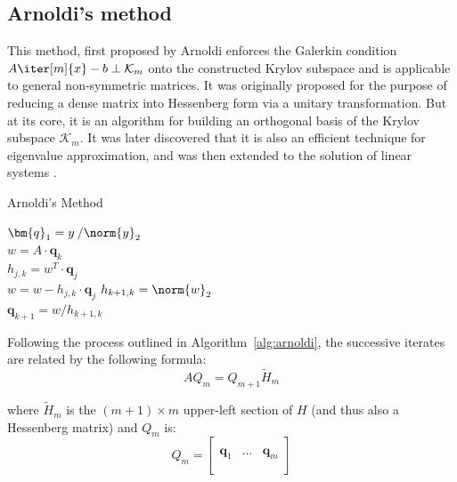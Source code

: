\subsection{Arnoldi's method}
\label{sec:arnoldi}
This method, first proposed by Arnoldi \cite{arnoldi_principle_1951} enforces the Galerkin condition $A\iter[m]{x} -b \perp \mathcal{K}_m$ onto the constructed Krylov subspace and is applicable to general non-symmetric matrices. It was originally proposed for the purpose of reducing a dense matrix into Hessenberg form via a unitary transformation. But at its core, it is an algorithm for building an orthogonal basis of the Krylov subspace $\mathcal{K}_m$. It was later discovered that it is also an efficient technique for eigenvalue approximation, and was then extended to the solution of linear systems \cite{saad_iterative_2003}. 

\begin{algorithm}[h]
  \caption{Arnoldi's Method}
  \label{alg:arnoldi}
  \SetAlgoLined
  $\bm{q}_1= y\:/\norm{y}_2$ \\
   {
    $w =A\cdot \bm{q}_k$ \\
     {
      $h_{j,k} = w^T\cdot \bm{q}_j$ \\
      $ w = w - h_{j,k}\cdot \bm{q}_j$}
    $h_{k+1,k} = \norm{w}_2$ \\
    $\bm{q}_{k+1} = w/h_{k+1,k}$
  }
\end{algorithm}

\noindent Following the process outlined in Algorithm~\hyperref[alg:arnoldi]{\ref{alg:arnoldi}}, the successive iterates are related by the following formula:
\begin{equation}
\label{eqn:arnoldi}
AQ_m=Q_{m+1}\tilde{H}_m
\end{equation}

\noindent where $\tilde{H}_m$ is the $(m+1) \times m$ upper-left section of $H$ (and thus also a Hessenberg matrix) and $Q_m$ is:
\begin{equation}
  Q_m =
  \left[
    \begin{array}{c|c|c}
      & & \\
      \bm{q}_1 &\dots & \bm{q}_m \\
      & & \\
    \end{array}
  \right] 
\end{equation}

